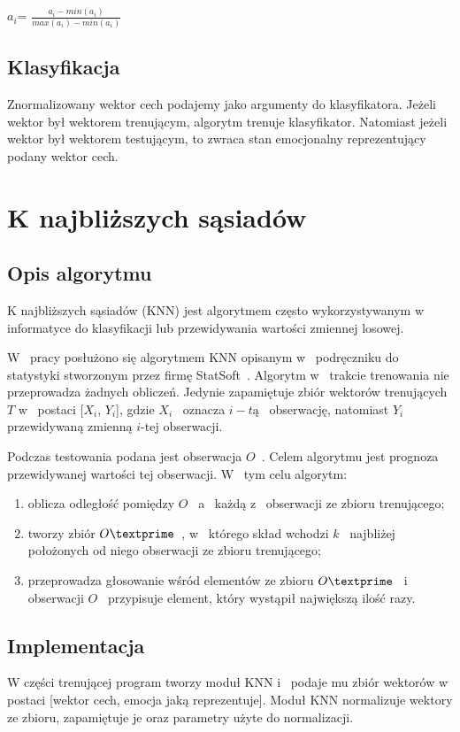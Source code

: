 \documentclass[declaration,shortabstract]{iithesis}
\begin{document}
$a_i$\textprime = $\frac{a_i - min(a_i)}{max(a_i) - min(a_i)}$

\section{Klasyfikacja}
Znormalizowany wektor cech podajemy jako argumenty do klasyfikatora. Jeżeli wektor był wektorem trenującym, algorytm trenuje klasyfikator. Natomiast jeżeli wektor był wektorem testującym, to zwraca stan emocjonalny reprezentujący podany wektor cech.

\chapter{K najbliższych sąsiadów}
\section{Opis algorytmu}
K najbliższych sąsiadów (KNN) jest algorytmem często wykorzystywanym w~ informatyce do klasyfikacji lub przewidywania wartości zmiennej losowej.  

W~ pracy posłużono się algorytmem KNN opisanym w~ podręczniku do statystyki stworzonym przez firmę StatSoft~\cite{KNN_Wstep}.
Algorytm w~ trakcie trenowania nie przeprowadza żadnych obliczeń. Jedynie zapamiętuje zbiór wektorów trenujących $T$ w~ postaci [$X_i$, $Y_i$], gdzie $X_i$~ oznacza $i-tą$~ obserwację, natomiast $Y_i$ przewidywaną zmienną $i$-tej obserwacji.

Podczas testowania podana jest obserwacja $O$~. Celem algorytmu jest prognoza przewidywanej wartości tej obserwacji. W~ tym celu algorytm:
\begin{enumerate}
\item oblicza odległość pomiędzy $O$~ a~ każdą z~ obserwacji ze zbioru trenującego;
\item tworzy zbiór $O\textprime$~, w~ którego skład wchodzi $k$~ najbliżej położonych od niego obserwacji ze zbioru trenującego;
\item przeprowadza głosowanie wśród elementów ze zbioru $O\textprime$~ i~ obserwacji $O$~ przypisuje element, który wystąpił największą ilość razy.
\end{enumerate}

\section{Implementacja}
W części trenującej program tworzy moduł KNN i~ podaje mu zbiór wektorów w postaci [wektor cech, emocja jaką reprezentuje]. Moduł KNN normalizuje wektory ze zbioru, zapamiętuje je oraz parametry użyte do normalizacji.
\end{document}
